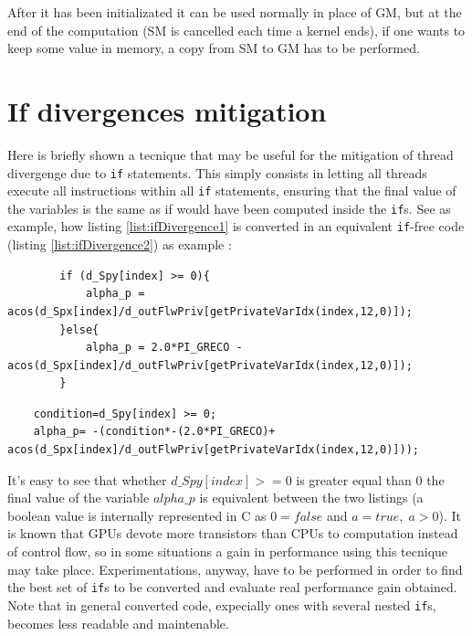 After it has been initializated it can be used normally in place of GM, but at
the end of the computation (SM is cancelled each time a kernel ends), if one
wants to keep some value in memory, a copy from SM to GM has to be performed.



\section{If divergences mitigation}
Here is briefly shown a tecnique that may be useful for the mitigation of
thread divergenge due to \texttt{if} statements.
This simply consists in letting all threads execute all instructions within all
\texttt{if} statements, ensuring that the final value of the variables is the
same as if would have been computed inside the \texttt{if}s.
See as example, how listing  \ref{list:ifDivergence1} is converted in an
equivalent \texttt{if}-free code (listing \ref{list:ifDivergence2}) as example :

\begin{lstlisting}
		if (d_Spy[index] >= 0){
			alpha_p = acos(d_Spx[index]/d_outFlwPriv[getPrivateVarIdx(index,12,0)]);
		}else{
			alpha_p = 2.0*PI_GRECO - acos(d_Spx[index]/d_outFlwPriv[getPrivateVarIdx(index,12,0)]);
		}
\end{lstlisting} 



\begin{lstlisting}
	condition=d_Spy[index] >= 0;
	alpha_p= -(condition*-(2.0*PI_GRECO)+ acos(d_Spx[index]/d_outFlwPriv[getPrivateVarIdx(index,12,0)]));
\end{lstlisting} 
It's easy to see that whether \(d\_Spy[index] >= 0\) is greater equal than
\(0\) the final value of the variable \(alpha\_p\) is equivalent between the two
listings (a boolean value \tcondition is internally represented in C as
\(0=false\) and \( a=true,\; a>0\)).
It is known that GPUs devote  more transistors than CPUs  to computation
instead of control flow, so in some situations a gain in performance using this
tecnique may take place. Experimentations, anyway, have to be performed in order
to find the best set of \texttt{if}s to be converted and evaluate real
performance gain obtained.
Note that in general converted code, expecially ones with several nested
\texttt{if}s, becomes less readable and maintenable.




